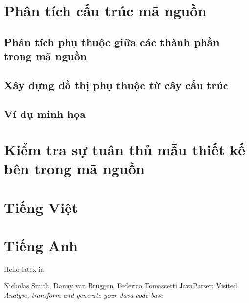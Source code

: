 \documentclass[12pt]{report}
\begin{document}
\section{Phân tích cấu trúc mã nguồn}
\subsection{Phân tích phụ thuộc giữa các thành phần trong mã nguồn}
\subsection{Xây dựng đồ thị phụ thuộc từ cây cấu trúc}
\subsection{Ví dụ minh họa}

\newpage
\section{Kiểm tra sự tuân thủ mẫu thiết kế bên trong mã nguồn}

\begin{thebibliography}{9}
	\section*{Tiếng Việt}
	\section*{Tiếng Anh}
	Hello latex	ia
	
	Nicholas Smith, Danny van Bruggen, Federico Tomassetti
	JavaParser: Visited
	\textit{Analyse, transform and generate your Java code base}
\end{thebibliography}
\end{document}
